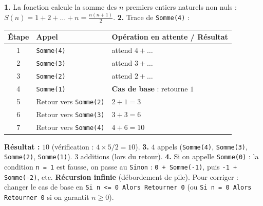 \documentclass[11pt]{article}
\begin{document}
\begin{corrige}
\textbf{1.} La fonction calcule la somme des $n$ premiers entiers naturels non nuls : $S(n) = 1 + 2 + \dots + n = \frac{n(n+1)}{2}$.
\textbf{2.} Trace de \texttt{Somme(4)} :

\begin{center}
\begin{tabularx}{\linewidth}{|c|l|X|}
\hline
\rowcolor{popblueL} Étape & Appel & Opération en attente / Résultat \\
\hline
1 & \texttt{Somme(4)} & attend $4 + \dots$ \\
\hline
2 & \texttt{Somme(3)} & attend $3 + \dots$ \\
\hline
3 & \texttt{Somme(2)} & attend $2 + \dots$ \\
\hline
4 & \texttt{Somme(1)} & \textbf{Cas de base} : retourne $1$ \\
\hline
5 & Retour vers \texttt{Somme(2)} & $2 + 1 = 3$ \\
\hline
6 & Retour vers \texttt{Somme(3)} & $3 + 3 = 6$ \\
\hline
7 & Retour vers \texttt{Somme(4)} & $4 + 6 = 10$ \\
\hline
\end{tabularx}
\end{center}
\textbf{Résultat :} $10$ (vérification : $4 \times 5 / 2 = 10$).
\textbf{3.} $4$ appels (\texttt{Somme(4)}, \texttt{Somme(3)}, \texttt{Somme(2)}, \texttt{Somme(1)}). $3$ additions (lors du retour).
\textbf{4.} Si on appelle \texttt{Somme(0)} : la condition \texttt{n = 1} est fausse, on passe au \texttt{Sinon} : \texttt{0 + Somme(-1)}, puis \texttt{-1 + Somme(-2)}, etc. \textbf{Récursion infinie} (débordement de pile). Pour corriger : changer le cas de base en \texttt{Si n <= 0 Alors Retourner 0} (ou \texttt{Si n = 0 Alors Retourner 0} si on garantit $n \ge 0$).
\end{corrige}
\end{document}
